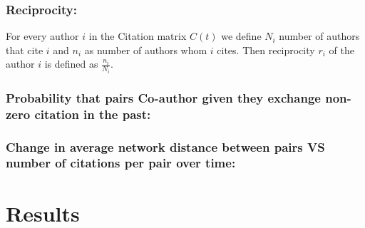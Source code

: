 \documentclass[aps, pre, twocolumn, nofootinbib]{revtex4-1}
\begin{document}
\subsubsection{Reciprocity:}
For every author $i$ in the Citation matrix $C(t)$ we define $N_i$ number of authors that cite $i$ and $n_i$ as number of authors whom $i$ cites. Then reciprocity $r_i$ of the author $i$ is defined as $\frac{n_i}{N_i}$. 

\subsubsection{Probability that pairs Co-author given they exchange non-zero citation in the past:}

\subsubsection{Change in average network distance between pairs VS number of citations per pair over time:}

\section{Results}
\end{document}

